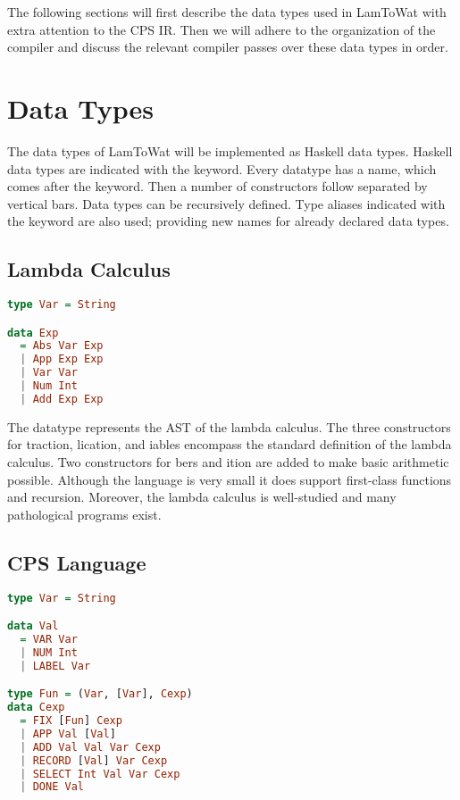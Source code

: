 The following sections will first describe the data types used in LamToWat with extra attention to the \ac{CPS} \ac{IR}. Then we will adhere to the organization of the compiler and discuss the relevant compiler passes over these data types in order.

\section{\label{section:datatypes}Data Types}
The data types of LamToWat will be implemented as Haskell data types. Haskell data types are indicated with the  keyword. Every datatype has a name, which comes after the keyword. Then a number of constructors follow separated by vertical bars. Data types can be recursively defined. Type aliases indicated with the  keyword are also used; providing new names for already declared data types.

\subsection{\label{subsection:expdata}Lambda Calculus}
\begin{lstlisting}[language=Haskell]
type Var = String

data Exp
  = Abs Var Exp
  | App Exp Exp
  | Var Var
  | Num Int
  | Add Exp Exp
\end{lstlisting}

The  datatype represents the \ac{AST} of the lambda calculus. The three constructors for traction, lication, and iables encompass the standard definition of the lambda calculus. Two constructors for bers and ition are added to make basic arithmetic possible. Although the language is very small it does support first-class functions and recursion. Moreover, the lambda calculus is well-studied \autocite{barendregt1984lambda} and many pathological programs exist.

\subsection{\label{subsection:cpsdata}CPS Language}
\begin{lstlisting}[language=Haskell]
type Var = String

data Val
  = VAR Var
  | NUM Int
  | LABEL Var

type Fun = (Var, [Var], Cexp)
data Cexp
  = FIX [Fun] Cexp
  | APP Val [Val]
  | ADD Val Val Var Cexp
  | RECORD [Val] Var Cexp
  | SELECT Int Val Var Cexp
  | DONE Val
\end{lstlisting}

